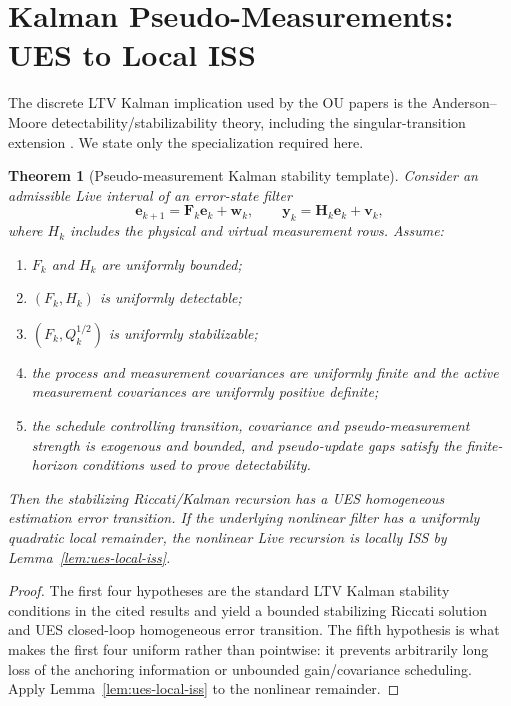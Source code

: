 \documentclass[conference]{IEEEtran}
\DeclareRobustCommand{\vct}[1]{\bm{#1}}
\DeclareRobustCommand{\mat}[1]{\bm{#1}}
\newtheorem{theorem}{Theorem}
\theoremstyle{remark}
\begin{document}
\section{Kalman Pseudo-Measurements: UES to Local ISS}
\label{sec:kalman-general}

The discrete LTV Kalman implication used by the OU papers is the
Anderson--Moore detectability/stabilizability theory, including the
singular-transition extension \cite{AndersonMoore1981_DetectabilityStabilizability,MooreAnderson1980_SingularTransitionStability}.
We state only the specialization required here.

\begin{theorem}[Pseudo-measurement Kalman stability template]
\label{thm:kalman-template}
Consider an admissible Live interval of an error-state filter
\begin{equation}
 \vct e_{k+1}=\mat F_k\vct e_k+\vct w_k,
 \qquad
 \vct y_k=\mat H_k\vct e_k+\vct v_k,
 \label{eq:ltv-kalman}
\end{equation}
where $H_k$ includes the physical and virtual measurement rows.  Assume:
\begin{enumerate}
 \item $F_k$ and $H_k$ are uniformly bounded;
 \item $(F_k,H_k)$ is uniformly detectable;
 \item $(F_k,Q_k^{1/2})$ is uniformly stabilizable;
 \item the process and measurement covariances are uniformly finite and the
       active measurement covariances are uniformly positive definite;
 \item the schedule controlling transition, covariance and pseudo-measurement
       strength is exogenous and bounded, and pseudo-update gaps satisfy the
       finite-horizon conditions used to prove detectability.
\end{enumerate}
Then the stabilizing Riccati/Kalman recursion has a UES homogeneous estimation
error transition.  If the underlying nonlinear filter has a uniformly quadratic
local remainder, the nonlinear Live recursion is locally ISS by
Lemma~\ref{lem:ues-local-iss}.
\end{theorem}

\begin{proof}
The first four hypotheses are the standard LTV Kalman stability conditions in
the cited results and yield a bounded stabilizing Riccati solution and UES
closed-loop homogeneous error transition.  The fifth hypothesis is what makes
the first four uniform rather than pointwise: it prevents arbitrarily long loss
of the anchoring information or unbounded gain/covariance scheduling.  Apply
Lemma~\ref{lem:ues-local-iss} to the nonlinear remainder.
\end{proof}
\end{document}

